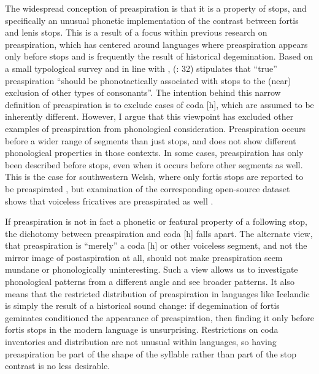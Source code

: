 \documentclass[output=paper,colorlinks,citecolor=brown]{langscibook}
\begin{document}
The widespread conception of preaspiration is that it is a property of stops, and specifically an unusual phonetic implementation of the contrast between fortis and lenis stops. This is a result of a focus within previous research on preaspiration, which has centered around languages where preaspiration appears only before stops and is frequently the result of historical degemination. Based on a small typological survey and in line with \citet{Helgason2002}, {\citeauthor{Clayton:2010}} (\citeyear{Clayton:2010}: 32) stipulates that ``true'' preaspiration ``should be phonotactically associated with stops to the (near) exclusion of other types of consonants''. The intention behind this narrow definition of preaspiration is to exclude cases of coda [h], which are assumed to be inherently different. However, I argue that this viewpoint has excluded other examples of preaspiration from phonological consideration.
Preaspiration occurs before a wider range of segments than just stops, and does not show different phonological properties in those contexts. In some cases, preaspiration has only been described before stops, even when it occurs before other segments as well. This is the case for southwestern Welsh, where only fortis stops are reported to be preaspirated \citep{iosad2017}, but examination of the corresponding open-source dataset shows that voiceless fricatives are preaspirated as well \citep{iosad-welshdata}.

If preaspiration is not in fact a phonetic or featural property of a following stop, the dichotomy between preaspiration and coda [h] falls apart. The alternate view, that preaspiration is ``merely'' a coda [h] or other voiceless segment, and not the mirror image of postaspiration at all, should not make preaspiration seem mundane or phonologically uninteresting. Such a view allows us to investigate phonological patterns from a different angle and see broader patterns. It also means that the restricted distribution of preaspiration in languages like Icelandic is simply the result of a historical sound change: if degemination of fortis geminates conditioned the appearance of preaspiration, then finding it only before fortis stops in the modern language is unsurprising. Restrictions on coda inventories and distribution are not unusual within languages, so having preaspiration be part of the shape of the syllable rather than part of the stop contrast is no less desirable. 
\end{document}
